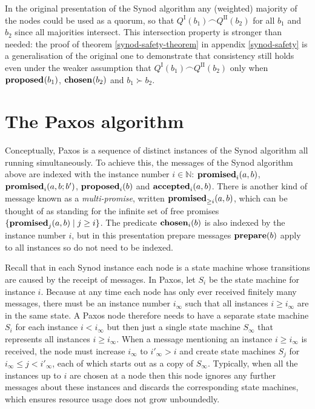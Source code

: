 \documentclass[journal]{IEEEtran}
\begin{document}
In the original presentation of the Synod algorithm any (weighted) majority of
the nodes could be used as a quorum, so that $Q^\textrm{I}(b_1) \frown
Q^\textrm{II}(b_2)$ for all $b_1$ and $b_2$ since all majorities intersect.
This intersection property is stronger than needed: the proof of theorem
\ref{synod-safety-theorem} in appendix \ref{synod-safety} is a generalisation
of the original one to demonstrate that consistency still holds even under the
weaker assumption that $Q^\textrm{I}(b_1) \frown Q^\textrm{II}(b_2)$ only when
$\mathbf{proposed}_{}(b_1)$, $\mathbf{chosen}_{}(b_2)$ and $b_1 \succ b_2$.

\section{The Paxos algorithm}

Conceptually, Paxos is a sequence of distinct instances of the Synod algorithm
all running simultaneously. To achieve this, the messages of the Synod
algorithm above are indexed with the instance number $i \in \mathbb N$:
$\mathbf{promised}_{i}(a,b)$, $\mathbf{promised}_{i}(a,b;b')$, $\mathbf{proposed}_{i}(b)$ and $\mathbf{accepted}_{i}(a,b)$.
There is another kind of message known as a \textit{multi-promise}, written
$\mathbf{promised}_{\ge i}(a,b)$, which can be thought of as standing for the infinite set of
free promises ${\{ \mathbf{promised}_{j}(a,b) \mid j \ge i \}}$. The predicate
$\mathbf{chosen}_{i}(b)$ is also indexed by the instance number $i$, but in this
presentation prepare messages $\mathbf{prepare}(b)$ apply to all instances so do not need
to be indexed.

Recall that in each Synod instance each node is a state machine whose
transitions are caused by the receipt of messages. In Paxos, let $S_i$ be the
state machine for instance $i$. Because at any time each node has only ever
received finitely many messages, there must be an instance number $i_\infty$
such that all instances $i \ge i_\infty$ are in the same state. A Paxos node
therefore needs to have a separate state machine $S_i$ for each instance $i <
i_\infty$ but then just a single state machine $S_\infty$ that represents all
instances $i \ge i_\infty$. When a message mentioning an instance $i \ge
i_\infty$ is received, the node must increase $i_\infty$ to $i'_\infty > i$ and
create state machines $S_j$ for $i_\infty \le j < i'_\infty$, each of which
starts out as a copy of $S_\infty$. Typically, when all the instances up to $i$
are chosen at a node then this node ignores any further messages about these
instances and discards the corresponding state machines, which ensures resource
usage does not grow unboundedly.
\end{document}
